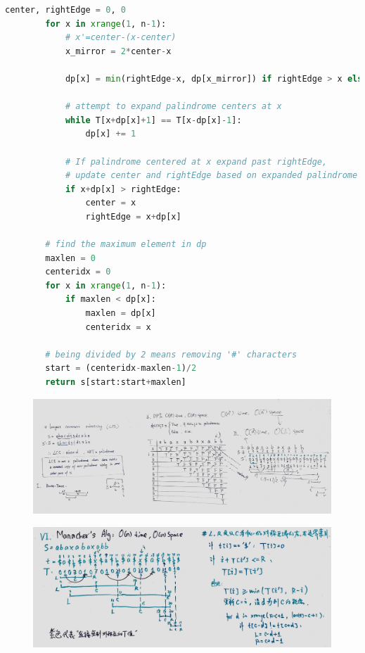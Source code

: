 \documentclass[a4paper,10pt]{article}
\begin{document}
\begin{lstlisting}[language=Python, caption=Problem5. Longest Palindromic Substring]
        center, rightEdge = 0, 0
        for x in xrange(1, n-1):
            # x'=center-(x-center)
            x_mirror = 2*center-x

            dp[x] = min(rightEdge-x, dp[x_mirror]) if rightEdge > x else 0

            # attempt to expand palindrome centers at x
            while T[x+dp[x]+1] == T[x-dp[x]-1]:
                dp[x] += 1

            # If palindrome centered at x expand past rightEdge,
            # update center and rightEdge based on expanded palindrome
            if x+dp[x] > rightEdge:
                center = x
                rightEdge = x+dp[x]

        # find the maximum element in dp
        maxlen = 0
        centeridx = 0
        for x in xrange(1, n-1):
            if maxlen < dp[x]:
                maxlen = dp[x]
                centeridx = x
        
        # being divided by 2 means removing '#' characters
        start = (centeridx-maxlen-1)/2
        return s[start:start+maxlen]
\end{lstlisting}

\begin{figure}[h]
    \includegraphics[width=\textwidth]{leetcode5-1.jpg}
    \centering
\end{figure}

\begin{figure}[h]
    \includegraphics[width=\textwidth]{leetcode5-2.jpg}
    \centering \\
\end{figure}
\end{document}
